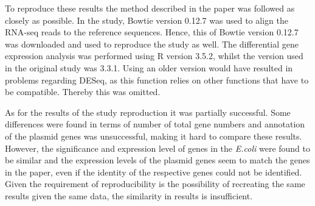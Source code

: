 

To reproduce these results the method described in the paper was followed as closely as possible. In the study, Bowtie version 0.12.7 was used to align the RNA-seq reads to the reference sequences. Hence, this of Bowtie version 0.12.7 was downloaded and used to reproduce the study as well. The differential gene expression analysis was performed using R version 3.5.2, whilst the version used in the original study was 3.3.1. Using an older version would have resulted in problems regarding DESeq, as this function relies on other functions that have to be compatible. Thereby this was omitted.



As for the results of the study reproduction it was partially successful. Some differences were found in terms of number of total gene numbers and annotation of the plasmid genes was unsuccessful, making it hard to compare these results. However, the significance and expression level of genes in the \textit{E.coli} were found to be similar and the expression levels of the plasmid genes seem to match the genes in the paper, even if the identity of the respective genes could not be identified. Given the requirement of reproducibility is the possibility of recreating the same results given the same data, the similarity in results is insufficient. 
















